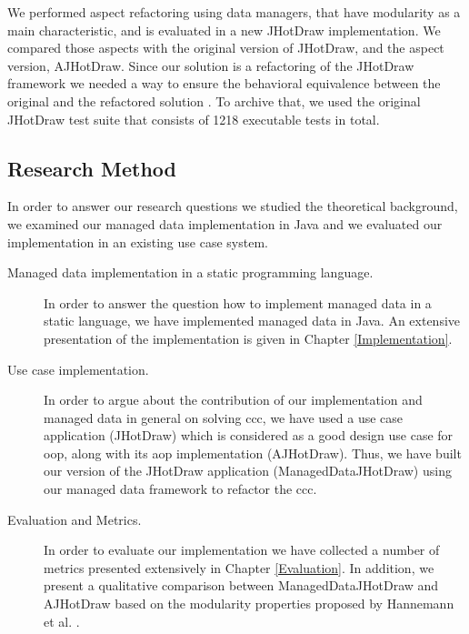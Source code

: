 We performed aspect refactoring using data managers, that have modularity as a main characteristic, and is evaluated in a new JHotDraw implementation.
We compared those aspects with the original version of JHotDraw, and the aspect version, AJHotDraw. 
Since our solution is a refactoring of the JHotDraw framework we needed a way to ensure the behavioral equivalence between the original and the refactored solution \cite{fowler2009refactoring}.
To archive that, we used the original JHotDraw test suite that consists of 1218 executable tests in total.

\subsection{Research Method}\label{Research Method}
In order to answer our research questions we studied the theoretical background, we examined our managed data implementation in Java and we evaluated our implementation in an existing use case system.

\begin{description}

  \item[Managed data implementation in a static programming language.]
  In order to answer the question how to implement managed data in a static language, we have implemented managed data in Java. 
  An extensive presentation of the implementation is given in Chapter \ref{Implementation}.

  \item[Use case implementation.] 
  In order to argue about the contribution of our implementation and managed data in general on solving \ac{ccc}, we have used a use case application (JHotDraw) which is considered as a good design use case for \ac{oop}, along with its \ac{aop} implementation (AJHotDraw).
  Thus, we have built our version of the JHotDraw application (ManagedDataJHotDraw) using our managed data framework to refactor the \ac{ccc}.

  \item[Evaluation and Metrics.]
  In order to evaluate our implementation we have collected a number of metrics presented extensively in Chapter \ref{Evaluation}.
  In addition, we present a qualitative comparison between ManagedDataJHotDraw and AJHotDraw based on the modularity properties proposed by Hannemann et al. \cite{hannemann2005role}.

\end{description}	

